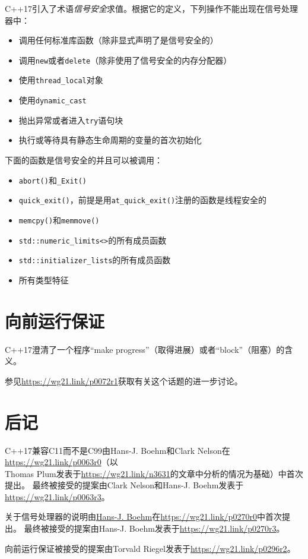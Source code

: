 C++17引入了术语\emph{信号安全}求值。根据它的定义，下列操作不能出现在信号处理器中：
\begin{itemize}
    \item 调用任何标准库函数（除非显式声明了是信号安全的）
    \item 调用\texttt{new}或者\texttt{delete}（除非使用了信号安全的内存分配器）
    \item 使用\texttt{thread\_local}对象
    \item 使用\texttt{dynamic\_cast}
    \item 抛出异常或者进入\texttt{try}语句块
    \item 执行或等待具有静态生命周期的变量的首次初始化
\end{itemize}
下面的函数是信号安全的并且可以被调用：
\begin{itemize}
    \item \texttt{abort()}和\texttt{\_Exit()}
    \item \texttt{quick\_exit()}，前提是用\texttt{at\_quick\_exit()}注册的函数是线程安全的
    \item \texttt{memcpy()}和\texttt{memmove()}
    \item \texttt{std::numeric\_limits<>}的所有成员函数
    \item \texttt{std::initializer\_lists}的所有成员函数
    \item 所有类型特征
\end{itemize}

\section{向前运行保证}
C++17澄清了一个程序“make progress”（取得进展）或者“block”（阻塞）的含义。

参见\url{https://wg21.link/p0072r1}获取有关这个话题的进一步讨论。

\section{后记}
C++17兼容C11而不是C99由Hans-J. Boehm和Clark Nelson在\url{https://wg21.link/p0063r0}（以\\
Thomas Plum发表于\url{https://wg21.link/n3631}的文章中分析的情况为基础）中首次提出。
最终被接受的提案由Clark Nelson和Hans-J. Boehm发表于\url{https://wg21.link/p0063r3}。

关于信号处理器的说明由\url{Hans-J. Boehm}在\url{https://wg21.link/p0270r0}中首次提出。
最终被接受的提案由Hans-J. Boehm发表于\url{https://wg21.link/p0270r3}。

向前运行保证被接受的提案由Torvald Riegel发表于\url{https://wg21.link/p0296r2}。